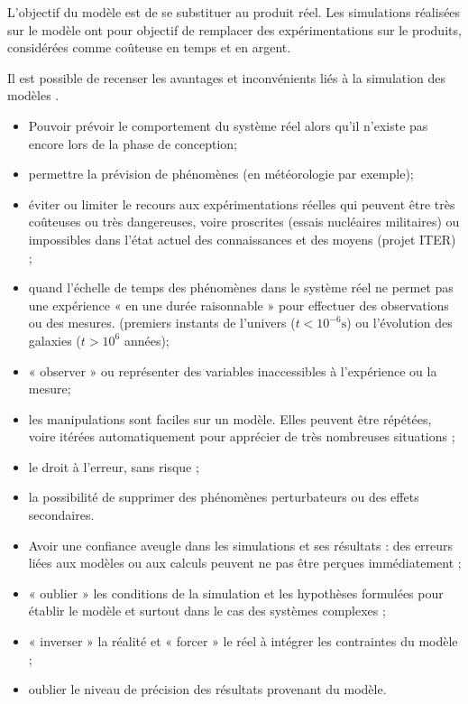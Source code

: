 \documentclass[10pt,fleqn]{article} %
\begin{document}
L'objectif du modèle est de se substituer au produit réel. Les simulations réalisées sur le modèle ont pour objectif de remplacer des expérimentations sur le produits, considérées comme coûteuse en temps et en argent. 

Il est possible de recenser les avantages et inconvénients liés à la simulation des modèles \cite{1}. 
\begin{multicols}{2}
\begin{itemize}[label=]
\item Pouvoir prévoir le comportement du système réel alors qu'il n’existe pas encore lors de la phase de conception;
\item permettre la prévision de phénomènes (en météorologie par exemple);
\item éviter ou limiter le recours aux expérimentations réelles qui peuvent être très
coûteuses ou très dangereuses, voire proscrites (essais nucléaires militaires) ou
impossibles dans l’état actuel des connaissances et des moyens (projet ITER) ;
\item quand l’échelle de temps des phénomènes dans le système réel ne permet pas une
expérience « en une durée raisonnable » pour effectuer des observations ou des mesures.
(premiers instants de l’univers ($t < 10^{-6} \text{s}$) ou l'évolution des galaxies
($t>10^6$ années);
\item « observer » ou représenter des variables inaccessibles à l'expérience ou la mesure;
\item les manipulations sont faciles sur un modèle. Elles peuvent être répétées, voire itérées
automatiquement pour apprécier de très nombreuses situations ;
\item le droit à l’erreur, sans risque ;
\item la possibilité de supprimer des phénomènes perturbateurs ou des effets
secondaires.
\end{itemize}
\vfill\null
\columnbreak

\begin{itemize}[label=]
\item Avoir une confiance aveugle dans les simulations et ses résultats : des erreurs liées aux
modèles ou aux calculs peuvent ne pas être perçues immédiatement ;
\item « oublier » les conditions de la simulation et les hypothèses formulées pour établir le
modèle et surtout dans le cas des systèmes complexes ;
\item « inverser » la réalité et « forcer » le réel à intégrer les contraintes du modèle ;
\item oublier le niveau de précision des résultats provenant du modèle.
\end{itemize}
\end{multicols}
\end{document}
